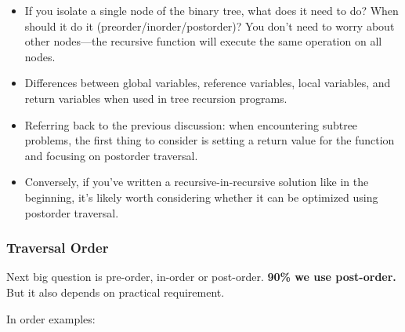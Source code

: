 \documentclass[a4paper,11pt,twoside]{book}
\begin{document}
\begin{itemize}

	\item If you isolate a single node of the binary tree, what does it need to do? When should it do it (preorder/inorder/postorder)? You don’t need to worry about other nodes—the recursive function will execute the same operation on all nodes.
	
	\item Differences between global variables, reference variables, local variables, and return variables when used in tree recursion programs.

	\item Referring back to the previous discussion: when encountering subtree problems, the first thing to consider is setting a return value for the function and focusing on postorder traversal.

	\item Conversely, if you’ve written a recursive-in-recursive solution like in the beginning, it’s likely worth considering whether it can be optimized using postorder traversal.

\end{itemize}



\subsubsection{Traversal Order}

\par Next big question is pre-order, in-order or post-order. \textbf{90\% we use post-order.} But it also depends on practical requirement.

\par In order examples:
\end{document}

